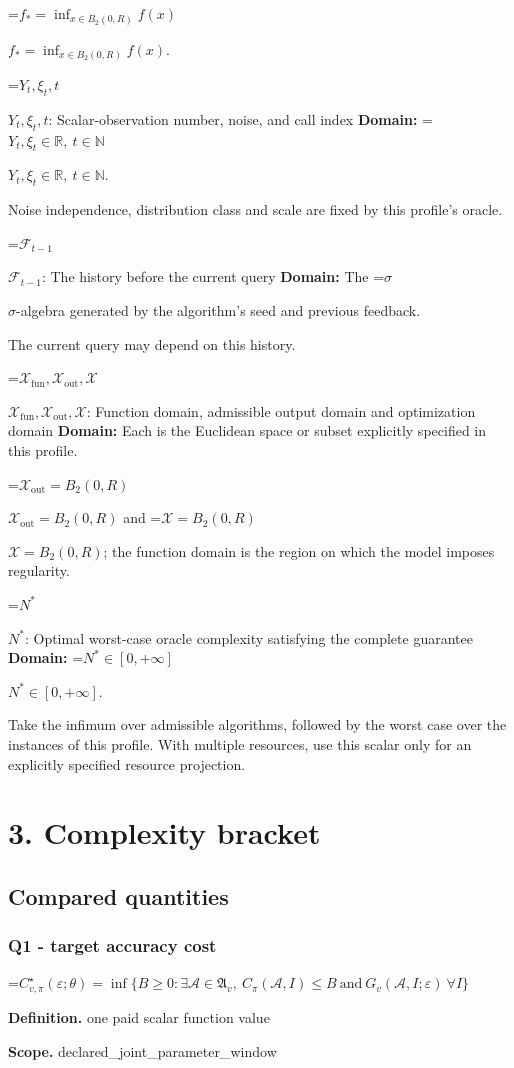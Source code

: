 \documentclass[10pt,a4paper]{article}
\newcommand{\AtlasMath}[1]{\par\begingroup\centering\setbox0=\hbox{$\displaystyle #1$}\ifdim\wd0>1.4\linewidth\typeout{ATLAS WIDE FORMULA: \the\wd0}\fi\ifdim\wd0>\linewidth\resizebox{\linewidth}{!}{\box0}\else\box0\fi\par\endgroup}
\newcommand{\AtlasInlineMath}[1]{\begingroup\setbox0=\hbox{$#1$}\ifdim\wd0>.4\linewidth\endgroup\AtlasMath{#1}\else\endgroup$#1$\fi}
\begin{document}
\AtlasInlineMath{f_*=\inf_{x\in B_2(0,R)}f(x)}.

\AtlasInlineMath{Y_t,\xi_t,t}: Scalar-observation number, noise, and call index \textbf{Domain:} \AtlasInlineMath{Y_t,\xi_t\in\mathbb{R},\ t\in\mathbb{N}}.

Noise independence, distribution class and scale are fixed by this profile's oracle.

\AtlasInlineMath{\mathcal{F}_{t-1}}: The history before the current query \textbf{Domain:} The \AtlasInlineMath{\sigma}-algebra generated by the algorithm's seed and previous feedback.

The current query may depend on this history.

\AtlasInlineMath{\mathcal{X}_{\mathrm{fun}},\mathcal{X}_{\mathrm{out}},\mathcal{X}}: Function domain, admissible output domain and optimization domain \textbf{Domain:} Each is the Euclidean space or subset explicitly specified in this profile.

\AtlasInlineMath{\mathcal{X}_{\mathrm{out}}=B_2(0,R)} and \AtlasInlineMath{\mathcal{X}=B_2(0,R)}; the function domain is the region on which the model imposes regularity.

\AtlasInlineMath{N^*}: Optimal worst-case oracle complexity satisfying the complete guarantee \textbf{Domain:} \AtlasInlineMath{N^*\in[0,+\infty]}.

Take the infimum over admissible algorithms, followed by the worst case over the instances of this profile. With multiple resources, use this scalar only for an explicitly specified resource projection.

\section{3. Complexity bracket}
\subsection{Compared quantities}
\subsubsection{Q1 - target accuracy cost}
\AtlasMath{C^\star_{v,\pi}(\varepsilon;\theta)=\inf\{B\ge0:\exists\mathcal A\in\mathfrak A_v,\ C_\pi(\mathcal A,I)\le B\ \text{and}\ G_v(\mathcal A,I;\varepsilon)\ \forall I\}}
\textbf{Definition.} one paid scalar function value

\textbf{Scope.} declared\_joint\_parameter\_window
\end{document}
